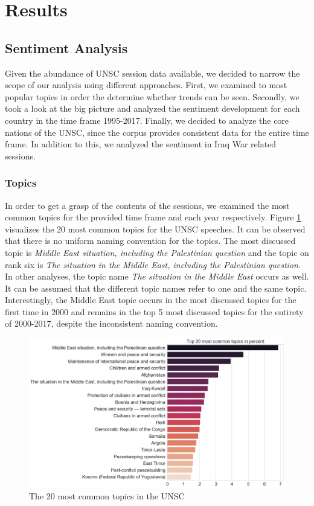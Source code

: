 \section{Results}
\label{results}

\subsection{Sentiment Analysis}
Given the abundance of UNSC session data available, we decided to narrow the scope of our analysis using different approaches. First, we examined to most popular topics in order the determine whether trends can be seen. Secondly, we took a look at the big picture and analyzed the sentiment development for each country in the time frame 1995-2017. Finally, we decided to analyze the core nations of the UNSC, since the corpus provides consistent data for the entire time frame. In addition to this, we analyzed the sentiment in Iraq War related sessions. 
\subsubsection{Topics}
In order to get a grasp of the contents of the sessions, we examined the most common topics for the provided time frame and each year respectively. Figure \ref{common_1} visualizes the 20 most common topics for the UNSC speeches. It can be observed that there is no uniform naming convention for the topics. The most discussed topic is \textit{Middle East situation, including the Palestinian question} and the topic on rank six is \textit{The situation in the Middle East, including the Palestinian question}. In other analyses, the topic name \textit{The situation in the Middle East} occurs as well. It can be assumed that the different topic names refer to one and the same topic.  
Interestingly, the Middle East topic occurs in the most discussed topics for the first time in 2000 and remains in the top 5 most discussed topics for the entirety of 2000-2017, despite the inconsistent naming convention.

\begin{figure}[h]
  \centering
  \includegraphics[width=14.5cm]{img/20most_common_topics.png}
  \caption{The 20 most common topics in the UNSC}
  \label{common_1}
\end{figure}%

